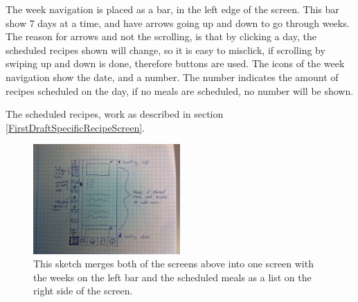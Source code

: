 The week navigation is placed as a bar, in the left edge of the screen. This bar show 7 days at a time, and have arrows going up and down to go through weeks. The reason for arrows and not the scrolling, is that by clicking a day, the scheduled recipes shown will change, so it is easy to misclick, if scrolling by swiping up and down is done, therefore buttons are used.
The icons of the week navigation show the date, and a number. The number indicates the amount of recipes scheduled on the day, if no meals are scheduled, no number will be shown. 

The scheduled recipes, work as described in section \ref{FirstDraftSpecificRecipeScreen}.

\begin{figure}[H]
	\centering
    \includegraphics[width=0.5\textwidth]{Grafik/FoodPlanner/FinalMealScheduleSketch2}
	\caption{This sketch merges both of the screens above into one screen with the weeks on the left bar and the scheduled meals as a list on the right side of the screen.}
	\label{MealScheduleBar}
\end{figure}

